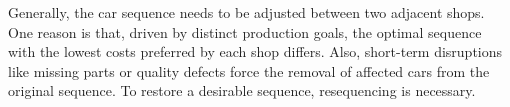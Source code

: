 \documentclass[12pt]{article}
\begin{document}
Generally, the car sequence needs to be adjusted between two adjacent shops. One reason is that, driven by distinct production goals, the optimal sequence with the lowest costs preferred by each shop differs. Also, short-term disruptions like missing parts or quality defects force the removal of affected cars from the original sequence. To restore a desirable sequence, resequencing is necessary.




\end{document}
